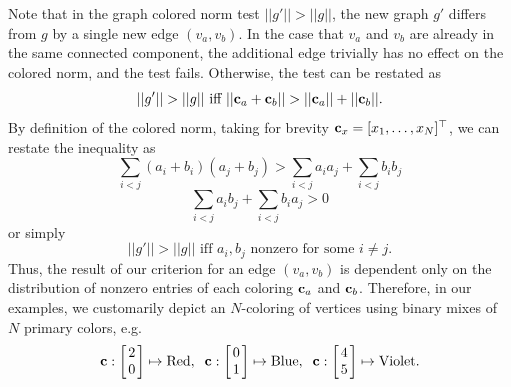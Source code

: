 \documentclass{report}
\begin{document}
Note that in the graph colored norm test
$||g'|| > ||g||$,
the new graph $g'$ differs from $g$ by a single new edge $(v_a,v_b)$.
In the case that $v_a$ and $v_b$ are already in the same connected component,
the additional edge trivially has no effect on the colored norm,
and the test fails.
Otherwise, the test can be restated as
\begin{equation}
   ||g'|| > ||g||
   \mbox{~iff~}
   ||{\bf c}_a+{\bf c}_b|| > ||{\bf c}_a|| + ||{\bf c}_b||.
\end{equation}
By definition of the colored norm,
taking for brevity ${\bf c}_x = [x_1,\dots,x_N]^\top$,
we can restate the inequality as
\begin{equation}
   \sum_{i<j} (a_i+b_i)(a_j+b_j) > \sum_{i<j} a_i a_j + \sum_{i<j} b_i b_j
\end{equation}
\begin{equation}
   \sum_{i<j} a_i b_j + \sum_{i<j} b_i a_j > 0
\end{equation}
or simply
\begin{equation}
   ||g'|| > ||g||
   \mbox{~iff~}
   a_i,b_j
   \mbox{~nonzero for some~} i \neq j.
   \label{eqn:graphnorm-wrtcolorings}
\end{equation}
Thus,
the result of our criterion for an edge $(v_a,v_b)$
is dependent only on the distribution of nonzero entries of each coloring
${\bf c}_a$ and ${\bf c}_b$.
Therefore, in our examples,
we customarily depict an $N$-coloring of vertices using
binary mixes of $N$ primary colors, e.g.
\[
   \arraycolsep=1.4pt
   {\bf c} : \left[\begin{array}{c}
      2 \\ 0 \\
   \end{array}\right]
   \mapsto
   \mbox{Red},
   \;\;
   {\bf c} : \left[\begin{array}{c}
      0 \\ 1 \\
   \end{array}\right]
   \mapsto
   \mbox{Blue},
   \;\;
   {\bf c} : \left[\begin{array}{c}
      4 \\ 5 \\
   \end{array}\right]
   \mapsto
   \mbox{Violet}.
\]
\end{document}
